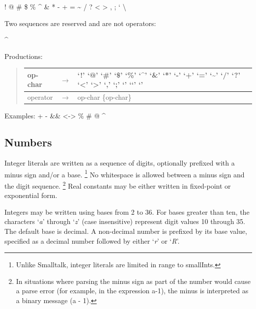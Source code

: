 \documentclass[letterpaper,10pt,english]{sphinxmanual}
\begin{document}
! @ \# \$ \% \textasciicircum{} \& * - + = \textasciitilde{} / ? \textless{} \textgreater{} , ; \textbar{} ‘ \textbackslash{}

Two sequences are reserved and are not operators:

\textbar{} \textasciicircum{}

Productions:
\begin{quote}

\begin{tabulary}{\linewidth}{|L|L|L|}
\hline

op-char
 & 
\(\rightarrow\)
 & 
‘!’ \textbar{} ‘@’ \textbar{} ‘\#’ \textbar{} ‘\$’ \textbar{} ‘\%’ \textbar{} ‘\textasciicircum{}’ \textbar{} ‘\&’ \textbar{} ‘*’ \textbar{} ‘-’ \textbar{} ‘+’ \textbar{} ‘=’ \textbar{} ‘\textasciitilde{}’ \textbar{} ‘/’ \textbar{} ‘?’ \textbar{}‘\textless{}’ \textbar{} ‘\textgreater{}’ \textbar{} ‘,’ \textbar{} ‘;’ \textbar{} ‘\textbar{}’ \textbar{} ‘‘’ \textbar{} ‘’
\\\hline

operator
 & 
\(\rightarrow\)
 & 
op-char \{op-char\}
\\\hline
\end{tabulary}

\end{quote}

Examples: + - \&\& \textbar{}\textbar{} \textless{}-\textgreater{} \% \# @ \textasciicircum{}


\subsection{Numbers}
\label{langref:index-65}\label{langref:numbers}
Integer literals are written as a sequence of digits, optionally prefixed with a minus sign and/or a
base. \footnote{
Unlike Smalltalk, integer literals are limited in range to smallInts.
} No whitespace is allowed between a minus sign and the digit sequence. \footnote{
In situations where parsing the minus sign as part of the number would cause a parse error (for example, in the expression a-1), the minus is interpreted as a binary message (a - 1).
} Real constants may
be either written in fixed-point or exponential form.

Integers may be written using bases from 2 to 36. For bases greater than ten, the characters ‘\emph{a}’
through ‘\emph{z}’ (case insensitive) represent digit values 10 through 35. The default base is decimal. A
non-decimal number is prefixed by its base value, specified as a decimal number followed by either
‘\emph{r}’ or ‘\emph{R}’.
\end{document}
